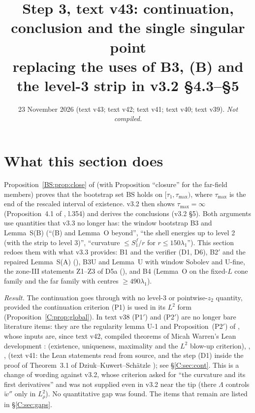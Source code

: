 \documentclass[11pt]{article}
\title{Step 3, text v43: continuation, conclusion and the single singular point\\[2pt]\large replacing the uses of B3, (B) and the level-3 strip in v3.2 \S4.3--\S5}
\author{}\date{23 November 2026 (text v43; text v42; text v41; text v40; text v39). \emph{Not compiled.}}
\begin{document}
\maketitle
\fi

\section{What this section does}\label{C:sec:intro}
Proposition~\ref{BS:prop:close} of  (with  Proposition ``closure'' for the far-field members) proves that the bootstrap set $\mathrm{BS}$ holds on $[\tau_1,\tau_{\max})$, where $\tau_{\max}$ is the end of the rescaled interval of existence. v3.2 then shows $\tau_{\max}=\infty$ (Proposition~4.1 of , l.354) and derives the conclusions (v3.2 \S5). Both arguments use quantities that v3.3 no longer has: the window bootstrap B3 and Lemma~S(B) (``(B) and Lemma~O beyond'', ``the shell energies up to level 2 (with the strip to level 3)'', ``curvature $\le S_1^f/r$ for $r\le150\lambda_1$''). This section redoes them with what v3.3 provides: B1 and the verifier (D1, D6), B2$'$ and the repaired Lemma~S(A) (), B3U and Lemma~U with window Sobolev and U-fine, the zone-III statements Z1--Z3 of D5a (), and B4 (Lemma~O on the fixed-$L$ cone family and the far family with centres $\ge490\lambda_1$).

\noindent\emph{Result.} The continuation goes through with no level-3 or pointwise-$z_2$ quantity, provided the continuation criterion (P1) is used in its $L^2$ form (Proposition~\ref{C:prop:global}). In text v38 (P1$'$) and (P2$'$) are no longer bare literature items: they are the regularity lemma U-1 and Proposition~(P2$'$) of  \tH, whose inputs are, since text v42, compiled theorems of Micah Warren's Lean development \cite{CWFlow}:  (existence, uniqueness, maximality and the $L^2$ blow-up criterion), , ,  (text v41: the Lean statements read from source, and the step (D1) inside the proof of Theorem~3.1 of Dziuk--Kuwert--Sch\"atzle \cite{DKS2002}); see \S\ref{C:sec:cont}. This is a change of wording against v3.2, whose criterion asked for ``the curvature and its first derivatives'' and was not supplied even in v3.2 near the tip (there $\Lambda$ controls $\tilde w''$ only in $L^2_\rho$). No quantitative gap was found. The items that remain are listed in \S\ref{C:sec:gaps}.
\end{document}
